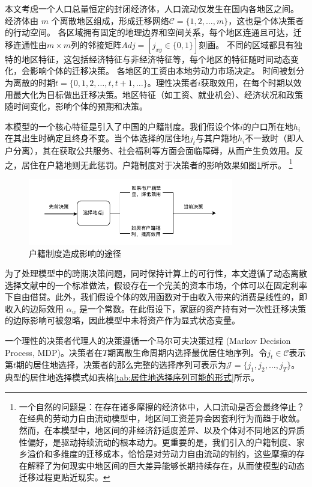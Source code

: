 \documentclass[master, final]{zufe-thesis}
\begin{document}
本文考虑一个人口总量恒定的封闭经济体，人口流动仅发生在国内各地区之间。
经济体由 $m$ 个离散地区组成，形成迁移网络$\mathcal{C} = \{1,2,\dots,m\}$，这也是个体决策者的行动空间。
各区域拥有固定的地理边界和空间关系，每个地区连通且可达，迁移连通性由$m \times m$列的邻接矩阵$Adj=[j_{xy}\in\{0,1\}]$刻画。 
不同的区域都具有独特的地区特征，这包括经济特征与非经济特征等，每个地区的特征随时间动态变化，会影响个体的迁移决策。
各地区的工资由本地劳动力市场决定。
时间被划分为离散的时期$t=\{0,1,2,\ldots,t,t+1,\ldots\}$。理性决策者$i$获取效用，在每个时期以效用最大化为目标做出迁移决策。地区特征（如工资、就业机会）、经济状况和政策随时间变化，影响个体的预期和决策。

本模型的一个核心特征是引入了中国的户籍制度。我们假设个体$i$的户口所在地$h_i$在其出生时确定且终身不变。当个体选择的居住地$j_t$与其户籍地$h_i$不一致时（即人户分离），其在获取公共服务、社会福利等方面会面临障碍，从而产生负效用。反之，居住在户籍地则无此惩罚。户籍制度对于决策者的影响效果如图\ref{fig:户籍制度造成影响的途径}所示。
\footnote{
一个自然的问题是：在存在诸多摩擦的经济体中，人口流动是否会最终停止？在经典的劳动力自由流动模型中，地区间工资差异会因套利行为而趋于收敛。然而，在本模型中，地区间的非经济舒适度差异、以及个体对不同地区的异质性偏好，是驱动持续流动的根本动力。更重要的是，我们引入的户籍制度、家乡溢价和多维度的迁移成本，恰恰是对劳动力自由流动的制约，这些摩擦的存在解释了为何现实中地区间的巨大差异能够长期持续存在，从而使模型的动态迁移过程更贴近现实。
}

\begin{figure}[!ht]
\centering
\includegraphics[width=0.8\textwidth]{images/户口影响.drawio.pdf}
\caption{户籍制度造成影响的途径}
\label{fig:户籍制度造成影响的途径}
\end{figure}

为了处理模型中的跨期决策问题，同时保持计算上的可行性，本文遵循了动态离散选择文献中的一个标准做法，假设存在一个完美的资本市场，个体可以在固定利率下自由借贷。此外，我们假设个体的效用函数对于由收入带来的消费是线性的，即收入的边际效用 $\alpha_w$ 是一个常数。在此假设下，家庭的资产持有对一次性迁移决策的边际影响可被忽略，因此模型中未将资产作为显式状态变量。

一个理性的决策者代理人的决策遵循一个马尔可夫决策过程 (Markov Decision Process, MDP)。决策者在$T$期离散生命周期内选择最优居住地序列。令$j_t \in \mathcal{C}$表示第$t$期的居住地选择，决策者的那么完整的选择序列可表示为$\mathcal{J}=\{j_1, j_2 ,\dots,j_T\}$。典型的居住地选择模式如表格\ref{tab:居住地选择序列可能的形式}所示。
\end{document}
